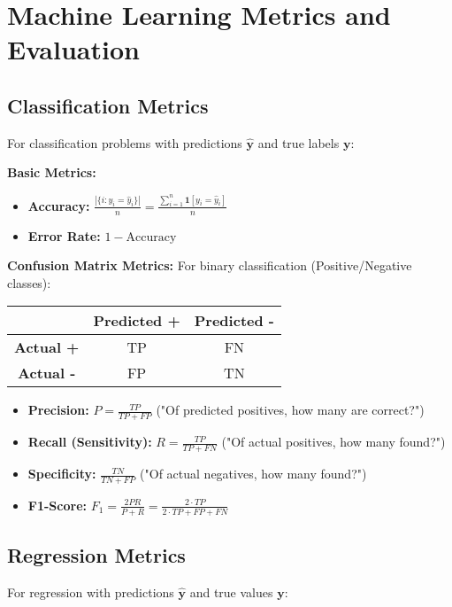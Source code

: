 \documentclass{article}
\providecommand{\vy}{\mathbf{y}}
\begin{document}
\section{Machine Learning Metrics and Evaluation}

\subsection{Classification Metrics}
For classification problems with predictions $\hat{\vy}$ and true labels $\vy$:

\textbf{Basic Metrics:}
\begin{itemize}
	\item \textbf{Accuracy:} $\frac{|\{i : y_i = \hat{y}_i\}|}{n} = \frac{\sum_{i=1}^n \mathbf{1}[y_i = \hat{y}_i]}{n}$
	\item \textbf{Error Rate:} $1 - \text{Accuracy}$
\end{itemize}

\textbf{Confusion Matrix Metrics:}
For binary classification (Positive/Negative classes):
\begin{center}
\begin{tabular}{|c|c|c|}
\hline
 & \textbf{Predicted +} & \textbf{Predicted -} \\
\hline
\textbf{Actual +} & TP & FN \\
\hline
\textbf{Actual -} & FP & TN \\
\hline
\end{tabular}
\end{center}

\begin{itemize}
	\item \textbf{Precision:} $P = \frac{TP}{TP + FP}$ ("Of predicted positives, how many are correct?")
	\item \textbf{Recall (Sensitivity):} $R = \frac{TP}{TP + FN}$ ("Of actual positives, how many found?")
	\item \textbf{Specificity:} $\frac{TN}{TN + FP}$ ("Of actual negatives, how many found?")
	\item \textbf{F1-Score:} $F_1 = \frac{2PR}{P + R} = \frac{2 \cdot TP}{2 \cdot TP + FP + FN}$
\end{itemize}

\subsection{Regression Metrics}
For regression with predictions $\hat{\vy}$ and true values $\vy$:
\end{document}
